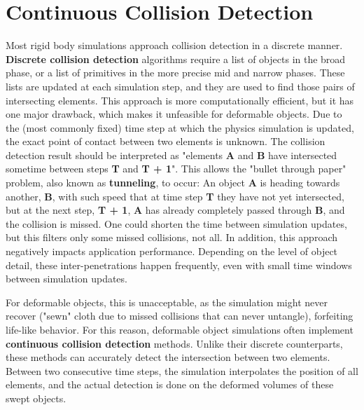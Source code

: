 \FloatBarrier
\section{Continuous Collision Detection}
\label{sec:ccd}

Most rigid body simulations approach collision detection in a discrete manner. \textbf{Discrete collision detection} algorithms require a list of objects in the broad phase, or a list of primitives in the more precise mid and narrow phases. These lists are updated at each simulation step, and they are used to find those pairs of intersecting elements. This approach is more computationally efficient, but it has one major drawback, which makes it unfeasible for deformable objects. Due to the (most commonly fixed) time step at which the physics simulation is updated, the exact point of contact between two elements is unknown. The collision detection result should be interpreted as "elements \textbf{A} and \textbf{B} have intersected sometime between steps \textbf{T} and \textbf{T + 1}". This allows the "bullet through paper" problem, also known as \textbf{tunneling}, to occur: An object \textbf{A} is heading towards another, \textbf{B}, with such speed that at time step \textbf{T} they have not yet intersected, but at the next step, \textbf{T + 1}, \textbf{A} has already completely passed through \textbf{B}, and the collision is missed. One could shorten the time between simulation updates, but this filters only some missed collisions, not all. In addition, this approach negatively impacts application performance. Depending on the level of object detail, these inter-penetrations happen frequently, even with small time windows between simulation updates.

For deformable objects, this is unacceptable, as the simulation might never recover ("sewn" cloth due to missed collisions that can never untangle), forfeiting life-like behavior. For this reason, deformable object simulations often implement \textbf{continuous collision detection} methods. Unlike their discrete counterparts, these methods can accurately detect the intersection between two elements. Between two consecutive time steps, the simulation interpolates the position of all elements, and the actual detection is done on the deformed volumes of these swept objects.

